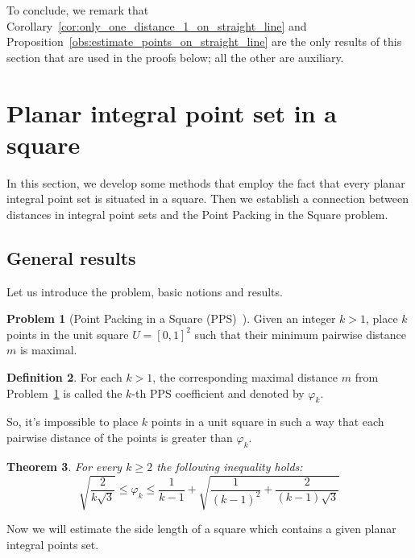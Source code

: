 \documentclass[a4paper,14pt]{article} %
\theoremstyle{plain}
\newtheorem{theorem}{Theorem}[section]
\theoremstyle{definition}
\newtheorem{definition}[theorem]{Definition}
\newtheorem{problem}[theorem]{Problem}
\begin{document}
To conclude, we remark that
Corollary~\ref{cor:only_one_distance_1_on_straight_line}
and
Proposition~\ref{obs:estimate_points_on_straight_line}
are the only results of this section
that are used in the proofs below;
all the other are auxiliary.



\section{Planar integral point set in a square}

In this section, we develop some methods that employ the fact that every planar integral point set is situated in a square.
Then we establish a connection between distances in integral point sets and the Point Packing in the Square problem.

\subsection{General results}

Let us introduce the problem, basic notions and results.

\begin{problem}[Point Packing in a Square (PPS)~\cite{locatelli2002packing,costa2013valid}]
	\label{problem:PPS}
	Given an integer $k > 1$, place $k$ points in the unit square $U = [ 0 , 1 ]^2$ such that their
	minimum pairwise distance $m$ is maximal.
\end{problem}

\begin{definition}
	For each $k > 1$, the corresponding maximal distance $m$ from Problem~\ref{problem:PPS}
	is called the $k$-th PPS coefficient and denoted by $\varphi_k$.
\end{definition}
So, it's impossible to place $k$ points in a unit square in such a way that each pairwise distance of the points is greater than $\varphi_k$.


\begin{theorem}
	\label{thm:varphi_k_bounds}
	\cite{costa2013valid}
	For every $k\geq 2$ the following inequality holds:
	\begin{equation*}
		\sqrt{\frac{2}{k\sqrt{3}}}
		\leq
		\varphi_k
		\leq
		\frac{1}{k-1} +
		\sqrt{
			\frac{1}{(k-1)^2}
			+
			\frac{2}{(k-1)\sqrt{3}}
		}
	\end{equation*}
\end{theorem}

Now we will estimate the side length of a square which contains a given planar integral points set.
\end{document}
